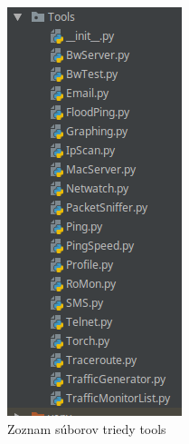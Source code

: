 \begin{figure}[H]
\centering
\includegraphics[scale=0.75]{../text/tools.png}
\caption{Zoznam súborov triedy tools}
\label{fig:tools}
\end{figure}
